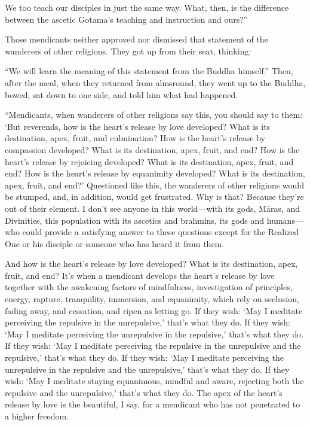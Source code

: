 \documentclass[12pt,openany]{book}%
\begin{document}
We too teach our disciples in just the same way. What, then, is the difference between the ascetic Gotama’s teaching and instruction and ours?” 

Those mendicants neither approved nor dismissed that statement of the wanderers of other religions. They got up from their seat, thinking: 

“We will learn the meaning of this statement from the Buddha himself.” Then, after the meal, when they returned from almsround, they went up to the Buddha, bowed, sat down to one side, and told him what had happened. 

“Mendicants, when wanderers of other religions say this, you should say to them: ‘But reverends, how is the heart’s release by love developed? What is its destination, apex, fruit, and culmination? How is the heart’s release by compassion developed? What is its destination, apex, fruit, and end? How is the heart’s release by rejoicing developed? What is its destination, apex, fruit, and end? How is the heart’s release by equanimity developed? What is its destination, apex, fruit, and end?’ Questioned like this, the wanderers of other religions would be stumped, and, in addition, would get frustrated. Why is that? Because they’re out of their element. I don’t see anyone in this world—with its gods, \textsanskrit{Māras}, and Divinities, this population with its ascetics and brahmins, its gods and humans—who could provide a satisfying answer to these questions except for the Realized One or his disciple or someone who has heard it from them. 

And how is the heart’s release by love developed? What is its destination, apex, fruit, and end? It’s when a mendicant develops the heart’s release by love together with the awakening factors of mindfulness, investigation of principles, energy, rapture, tranquility, immersion, and equanimity, which rely on seclusion, fading away, and cessation, and ripen as letting go. If they wish: ‘May I meditate perceiving the repulsive in the unrepulsive,’ that’s what they do. If they wish: ‘May I meditate perceiving the unrepulsive in the repulsive,’ that’s what they do. If they wish: ‘May I meditate perceiving the repulsive in the unrepulsive and the repulsive,’ that’s what they do. If they wish: ‘May I meditate perceiving the unrepulsive in the repulsive and the unrepulsive,’ that’s what they do. If they wish: ‘May I meditate staying equanimous, mindful and aware, rejecting both the repulsive and the unrepulsive,’ that’s what they do. The apex of the heart’s release by love is the beautiful, I say, for a mendicant who has not penetrated to a higher freedom. 
\end{document}

